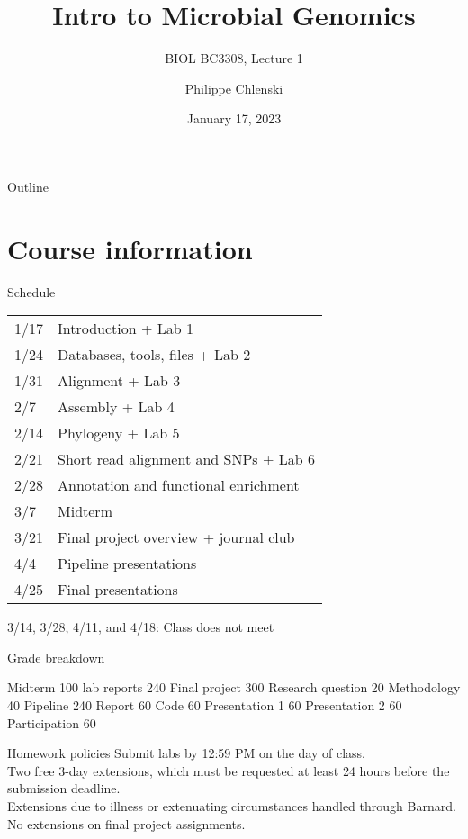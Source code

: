 \documentclass{beamer}
\title{Intro to Microbial Genomics}
\subtitle{BIOL BC3308, Lecture 1}
\author{Philippe Chlenski}
\date{January 17, 2023}
\begin{document}
\begin{frame}[plain]
\titlepage
\end{frame}

\begin{frame}{Outline}
\tableofcontents
\end{frame}

\section{Course information}

\begin{frame}{Schedule}
\begin{table}
\centering
\begin{tabular}{l l}
    1/17  & Introduction + Lab 1\\
    1/24  & Databases, tools, files + Lab 2\\
    1/31  & Alignment + Lab 3\\
    2/7   & Assembly + Lab 4\\
    2/14  & Phylogeny + Lab 5\\
    2/21  & Short read alignment and SNPs + Lab 6\\
    2/28  & Annotation and functional enrichment\\
    3/7   & Midterm\\
    3/21  & Final project overview + journal club\\
    4/4 & Pipeline presentations\\
    4/25  & Final presentations
\end{tabular}
\end{table}
3/14, 3/28, 4/11, and 4/18: Class does not meet
\end{frame}

\begin{frame}{Grade breakdown}
    \begin{outline}
        \1[] Midterm \hfill 100
         lab reports \hfill 240 
        \1[] Final project \hfill 300 
        \hline
            \2[] Research question \hfill 20 
            \2[] Methodology \hfill 40 
            \2[] Pipeline \hfill 240 
            \hline
                \3[] Report \hfill 60
                \3[] Code \hfill 60 
                \3[] Presentation 1 \hfill 60
                \3[] Presentation 2 \hfill 60
        \1[] Participation \hfill 60
    \end{outline}
\end{frame}

\begin{frame}{Homework policies}
Submit labs by 12:59 PM on the day of class.\\
\bigskip
Two free 3-day extensions, which must be requested at least 24 hours before the submission deadline.\\
\bigskip
Extensions due to illness or extenuating circumstances handled through Barnard.\\
\bigskip
No extensions on final project assignments.
\end{frame}
\end{document}
